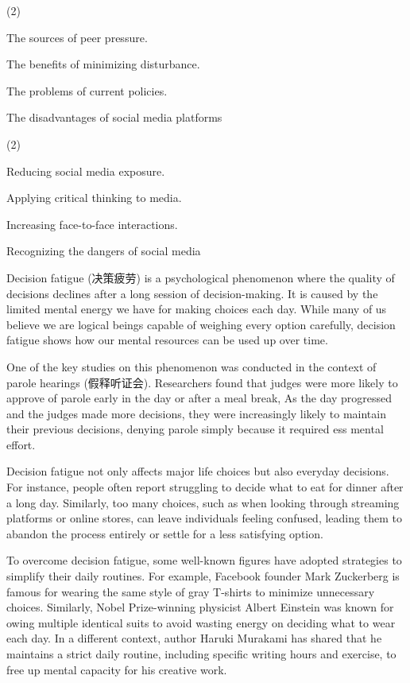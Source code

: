 \documentclass{英语试卷}
\begin{document}
\begin{choices}(2)
  \item The sources of peer pressure.
  \item The benefits of minimizing disturbance.
  \item The problems of current policies.
  \item The disadvantages of social media platforms
\end{choices}
\begin{choices}(2)
  \item Reducing social media exposure.
  \item Applying critical thinking to media.
  \item Increasing face-to-face interactions.
  \item Recognizing the dangers of social media
\end{choices}
\par Decision fatigue (决策疲劳) is a psychological phenomenon where the quality of decisions declines after a long session of decision-making. It is caused by the limited mental energy we have for making choices each day. While many of us believe we are logical beings capable of weighing every option carefully, decision fatigue shows how our mental resources can be used up over time.\par
\par One of the key studies on this phenomenon was conducted in the context of parole hearings (假释听证会). Researchers found that judges were more likely to approve of parole early in the day or after a meal break, As the day progressed and the judges made more decisions, they were increasingly likely to maintain their previous decisions, denying parole simply because it required ess mental effort.\par
\par Decision fatigue not only affects major life choices but also everyday decisions. For instance, people often report struggling to decide what to eat for dinner after a long day. Similarly, too many choices, such as when looking through streaming platforms or online stores, can leave individuals feeling confused, leading them to abandon the process entirely or settle for a less satisfying option.\par
\par To overcome decision fatigue, some well-known figures have adopted strategies to simplify their daily routines. For example, Facebook founder Mark Zuckerberg is famous for wearing the same style of gray T-shirts to minimize unnecessary choices. Similarly, Nobel Prize-winning physicist Albert Einstein was known for owing multiple identical suits to avoid wasting energy on deciding what to wear each day. In a different context, author Haruki Murakami has shared that he maintains a strict daily routine, including specific writing hours and exercise, to free up mental capacity for his creative work.\par
\end{document}
